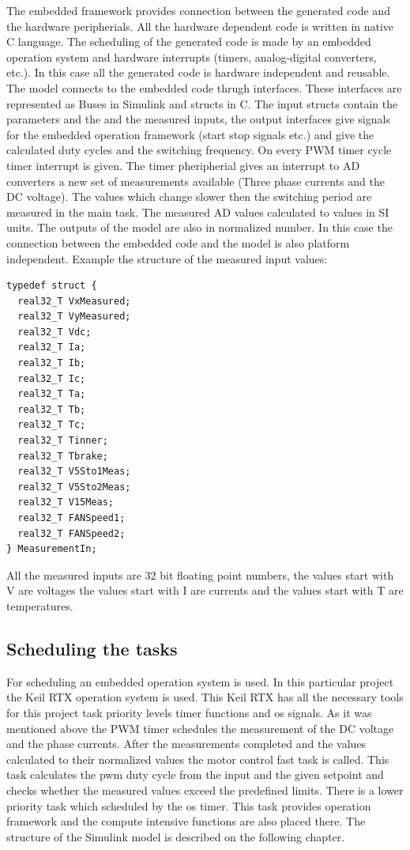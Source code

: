 The embedded framework provides connection between the generated code and the hardware peripherials. All the hardware dependent code is written in native C language. The scheduling of the generated code is made by an embedded operation system and hardware interrupts (timers, analog-digital converters, etc.). In this case all the generated code is hardware independent and reusable. The model connects to the embedded code thrugh interfaces. These interfaces are represented as Buses in Simulink and structs in C. The input structs contain the parameters and the and the measured inputs, the output interfaces give signals for the embedded operation framework (start stop signals etc.) and give the calculated duty cycles and the switching frequency. 
On every PWM timer cycle timer interrupt is given. The timer pheripherial gives an interrupt to AD converters a new set of measurements available (Three phase currents and the DC voltage). The values which change slower then the switching period are measured in the main task. The measured AD values calculated to values in SI units. The outputs of the model are also in normalized number. In this case the connection between the embedded code and the model is also platform independent. Example the structure of the measured input values:

\begin{lstlisting}
typedef struct { 
  real32_T VxMeasured; 
  real32_T VyMeasured; 
  real32_T Vdc; 
  real32_T Ia; 
  real32_T Ib; 
  real32_T Ic; 
  real32_T Ta; 
  real32_T Tb; 
  real32_T Tc; 
  real32_T Tinner; 
  real32_T Tbrake; 
  real32_T V5Sto1Meas; 
  real32_T V5Sto2Meas; 
  real32_T V15Meas; 
  real32_T FANSpeed1; 
  real32_T FANSpeed2; 
} MeasurementIn;

\end{lstlisting}

All the measured inputs are 32 bit floating point numbers, the values start with V are voltages the values start with I are currents and the values start with T are temperatures.

\subsection{Scheduling the tasks}
For scheduling an embedded operation system is used. In this particular project the Keil RTX operation system is used. This Keil RTX has all the necessary tools for this project task priority levels timer functions and os signals. As it was mentioned above the PWM timer schedules the measurement of the DC voltage and the phase currents. After the measurements completed and the values calculated to their normalized values the motor control fast task is called. This task calculates the pwm duty cycle from the input and the given setpoint and checks whether the measured values exceed the predefined limits. 
There is a lower priority task which scheduled by the os timer. This task provides operation framework and the compute intensive functions are also placed there. The structure of the Simulink model is described on the following chapter.



